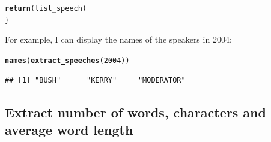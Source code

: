 \documentclass{llncs}\usepackage[]{graphicx}\usepackage[]{color}
\makeatletter
\newcommand{\hlnum}[1]{\textcolor[rgb]{0.686,0.059,0.569}{#1}}%
\newcommand{\hlstd}[1]{\textcolor[rgb]{0.345,0.345,0.345}{#1}}%
\newcommand{\hlkwd}[1]{\textcolor[rgb]{0.737,0.353,0.396}{\textbf{#1}}}%
\newenvironment{kframe}{%
 \def\at@end@of@kframe{}%
 \ifinner\ifhmode%
  \def\at@end@of@kframe{\end{minipage}}%
  \begin{minipage}{\columnwidth}%
 \fi\fi%
 \def\FrameCommand##1{\hskip\@totalleftmargin \hskip-\fboxsep
 \colorbox{shadecolor}{##1}\hskip-\fboxsep
     \hskip-\linewidth \hskip-\@totalleftmargin \hskip\columnwidth}%
 \MakeFramed {\advance\hsize-\width
   \@totalleftmargin\z@ \linewidth\hsize
   \@setminipage}}%
 {\par\unskip\endMakeFramed%
 \at@end@of@kframe}
\newenvironment{knitrout}{}{} %
\makeatother
\begin{document}
\begin{knitrout}
\begin{kframe}
\begin{alltt}
  \hlkwd{return}\hlstd{(list_speech)}
\hlstd{\}}
\end{alltt}
\end{kframe}
\end{knitrout}
For example, I can display the names of the speakers in 2004:

\begin{knitrout}
\color{fgcolor}\begin{kframe}
\begin{alltt}
\hlkwd{names}\hlstd{(}\hlkwd{extract_speeches}\hlstd{(}\hlnum{2004}\hlstd{))}
\end{alltt}
\begin{lstlisting}[basicstyle=\ttfamily,breaklines=true]
## [1] "BUSH"      "KERRY"     "MODERATOR"
\end{lstlisting}
\end{kframe}
\end{knitrout}
\subsection{Extract number of words, characters and average word length}
\end{document}
